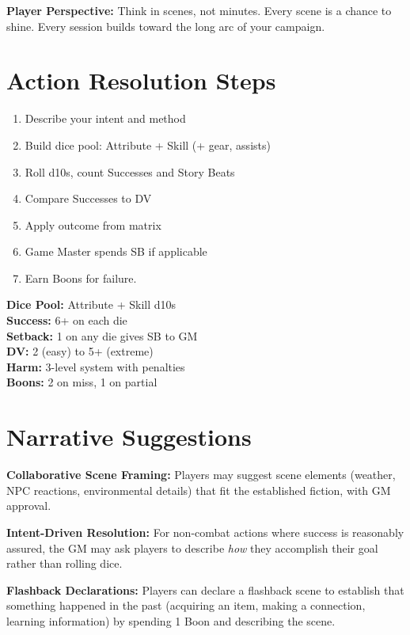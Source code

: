 \documentclass[11pt,twoside,openany]{book}
\begin{document}
\textbf{Player Perspective:} Think in scenes, not minutes. Every scene is a chance to shine. Every session builds toward the long arc of your campaign.

\section*{Action Resolution Steps} 

\begin{enumerate}
\item Describe your intent and method
\item Build dice pool: Attribute + Skill (+ gear, assists)
\item Roll d10s, count Successes and Story Beats
\item Compare Successes to DV
\item Apply outcome from matrix
\item Game Master spends SB if applicable
\item Earn Boons for failure.
\end{enumerate}

\begin{tcolorbox}[colback=gray!5!white, colframe=gray!75!black, title=Quick Reference, fonttitle=\bfseries]
\textbf{Dice Pool:} Attribute + Skill d10s\\
\textbf{Success:} 6+ on each die\\
\textbf{Setback:} 1 on any die gives SB to GM\\
\textbf{DV:} 2 (easy) to 5+ (extreme)\\
\textbf{Harm:} 3-level system with penalties\\
\textbf{Boons:} 2 on miss, 1 on partial
\end{tcolorbox}

\section*{Narrative Suggestions} 

\textbf{Collaborative Scene Framing:} Players may suggest scene elements (weather, NPC reactions, environmental details) that fit the established fiction, with GM approval.

\textbf{Intent-Driven Resolution:} For non-combat actions where success is reasonably assured, the GM may ask players to describe \emph{how} they accomplish their goal rather than rolling dice.

\textbf{Flashback Declarations:} Players can declare a flashback scene to establish that something happened in the past (acquiring an item, making a connection, learning information) by spending 1 Boon and describing the scene.
\end{document}
